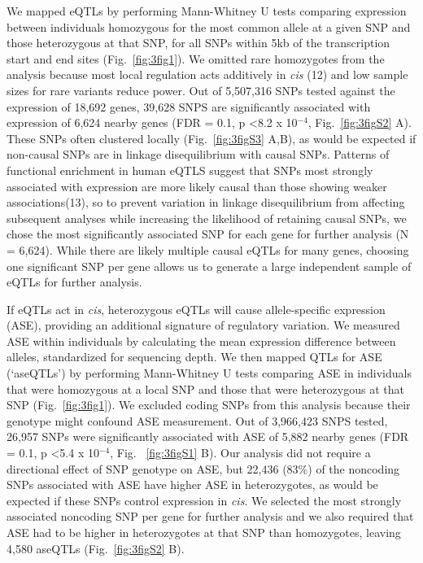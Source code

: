 We mapped eQTLs by performing Mann-Whitney U tests comparing expression between individuals homozygous for the most common allele at a given SNP and those heterozygous at that SNP, for all SNPs within 5kb of the transcription start and end sites (Fig.~\ref{fig:3fig1}). We omitted rare homozygotes from the analysis because most local regulation acts additively in \textit{cis} (12) and low sample sizes for rare variants reduce power. Out of 5,507,316 SNPs tested against the expression of 18,692 genes, 39,628 SNPS are significantly associated with expression of 6,624 nearby genes (FDR = 0.1, p \textless 8.2 x 10$^{-4}$, Fig.~\ref{fig:3figS2} A). These SNPs often clustered locally (Fig.~\ref{fig:3figS3} A,B), as would be expected if non-causal SNPs are in linkage disequilibrium with causal SNPs. Patterns of functional enrichment in human eQTLS suggest that SNPs most strongly associated with expression are more likely causal than those showing weaker associations(13), so to prevent variation in linkage disequilibrium from affecting subsequent analyses while increasing the likelihood of retaining causal SNPs, we chose the most significantly associated SNP for each gene for further analysis (N = 6,624). While there are likely multiple causal eQTLs for many genes, choosing one significant SNP per gene allows us to generate a large independent sample of eQTLs for further analysis.

If eQTLs act in \textit{cis}, heterozygous eQTLs will cause allele-specific expression (ASE), providing an additional signature of regulatory variation. We measured ASE within individuals by calculating the mean expression difference between alleles, standardized for sequencing depth. We then mapped QTLs for ASE (‘aseQTLs’) by performing Mann-Whitney U tests comparing ASE in individuals that were homozygous at a local SNP and those that were heterozygous at that SNP (Fig.~\ref{fig:3fig1}). We excluded coding SNPs from this analysis because their genotype might confound ASE measurement. Out of 3,966,423 SNPS tested, 26,957 SNPs were significantly associated with ASE of 5,882 nearby genes (FDR = 0.1, p \textless 5.4 x 10$^{-4}$, Fig. ~\ref{fig:3figS1} B). Our analysis did not require a directional effect of SNP genotype on ASE, but 22,436 (83\%) of the noncoding SNPs associated with ASE have higher ASE in heterozygotes, as would be expected if these SNPs control expression in \textit{cis}. We selected the most strongly associated noncoding SNP per gene for further analysis and we also required that ASE had to be higher in heterozygotes at that SNP than homozygotes, leaving 4,580 aseQTLs (Fig.~\ref{fig:3figS2} B). 

